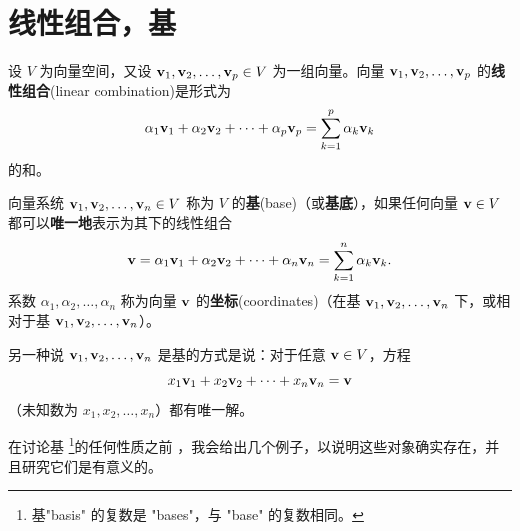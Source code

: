 \section{线性组合，基}\label{sec:01-02}
设 $V$ 为向量空间，又设 $\mathbf{v}_1, \mathbf{v}_2, \dots, \mathbf{v}_p \in V$ 为一组向量。向量 $\mathbf{v}_1, \mathbf{v}_2, \dots, \mathbf{v}_p$ 的\textbf{线性组合}(linear combination)是形式为
$$
\alpha_1 \mathbf{v}_1 + \alpha_2 \mathbf{v}_2 + \dots + \alpha_p \mathbf{v}_p = \sum_{k=1}^p \alpha_k \mathbf{v}_k
$$
的和。

\begin{definition}\label{stmt:01-02-01}
向量系统 $\mathbf{v}_1, \mathbf{v}_2, \dots, \mathbf{v}_n \in V$ 称为 $V$ 的\textbf{基}(base)（或\textbf{基底}），如果任何向量 $\mathbf{v} \in V$ 都可以\textbf{唯一地}表示为其下的线性组合
$$
\mathbf{v} = \alpha_1 \mathbf{v}_1 + \alpha_2 \mathbf{v}_2 + \dots + \alpha_n \mathbf{v}_n = \sum_{k=1}^n \alpha_k \mathbf{v}_k.
$$
系数 $\alpha_1, \alpha_2, \dots, \alpha_n$ 称为向量 $\mathbf{v}$ 的\textbf{坐标}(coordinates)（在基 $\mathbf{v}_1, \mathbf{v}_2, \dots, \mathbf{v}_n$ 下，或相对于基 $\mathbf{v}_1, \mathbf{v}_2, \dots, \mathbf{v}_n$）。
\end{definition}

另一种说 $\mathbf{v}_1, \mathbf{v}_2, \dots, \mathbf{v}_n$ 是基的方式是说：对于任意 $\mathbf{v}\in V$，方程
$$x_1 \mathbf{v}_1 + x_2 \mathbf{v}_2 + \dots + x_n \mathbf{v}_n = \mathbf{v}$$
（未知数为 $x_1,x_2,\dots,x_n$）都有唯一解。

在讨论基
\footnote{
基"basis" 的复数是 "bases"，与 "base" 的复数相同。
}的任何性质之前
，我会给出几个例子，以说明这些对象确实存在，并且研究它们是有意义的。


